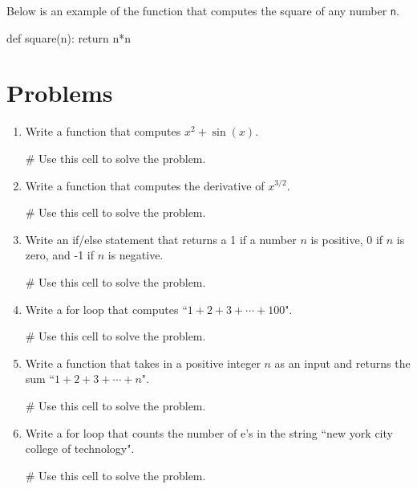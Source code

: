 \documentclass{ximera}
\begin{document}
Below is an example of the function that computes the square of any number \verb|n|.

\begin{sageCell}
def square(n):
        return n*n
\end{sageCell}

\section{Problems}

    \begin{enumerate}
    \item Write a function that computes $x^2+\sin(x)$.
\begin{sageCell}
# Use this cell to solve the problem.
\end{sageCell}

    \item Write a function that computes the derivative of $x^{3/2}$.
\begin{sageCell}
# Use this cell to solve the problem.
\end{sageCell}

    \item Write an if/else statement that returns a 1 if a number $n$ is positive, 0 if $n$ is zero, and -1 if $n$ is negative.
\begin{sageCell}
# Use this cell to solve the problem.
\end{sageCell}

    \item Write a for loop that computes ``$1+2+3+\cdots+100$".
\begin{sageCell}
# Use this cell to solve the problem.
\end{sageCell}

    \item Write a function that takes in a positive integer $n$ as an input and returns the sum ``$1+2+3+\cdots+n$".
\begin{sageCell}
# Use this cell to solve the problem.
\end{sageCell}

    \item Write a for loop that counts the number of e's in the string ``new york city college of technology".
\begin{sageCell}
# Use this cell to solve the problem.
\end{sageCell}

\end{enumerate}
\end{document}

